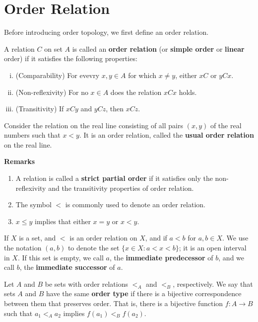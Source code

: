 \documentclass[a4paper,english,12pt]{article}
\begin{document}
\section{Order Relation}  

Before introducing order topology, we first define an order relation.
\begin{defn}
A relation $C$ on set $A$ is called an \textbf{order relation} (or  \textbf{simple order} or \textbf{linear} order) if it satisfies the following properties:
\begin{enumerate}[i)]
\item (Comparability) For evevry $x, y \in A$ for which $x \neq y$, either $x C$ or $y C x$.
\item (Non-reflexivity) For no $x \in A$ does the relation $x C x$ holds.
\item (Transitivity) If $x C y$ and $y C z$, then $x C z$.
\end{enumerate}
\end{defn}

\begin{exmp}
Consider the relation on the real line consisting of all pairs $(x, y)$ of the real numbers such that $x < y$. It is an order relation, called the \textbf{usual order relation} on the real line.
\end{exmp}


\textbf{Remarks}
\begin{enumerate}
\item A relation is called a \textbf{strict partial order} if it satisfies only the non-reflexivity and the transitivity properties of order relation.    
\item The symbol $<$ is commonly used to denote an order relation.
\item $x \le y$ implies that either $x = y$ or $x < y$. 
\end{enumerate}

\begin{defn}
If $X$ is a set, and $<$ is an order relation on $X$, and if $a < b$ for $a, b \in X$. We use the notation $(a,b)$ to denote the set $ \{ x \in X: a < x < b \}$; it is an open interval in $X$. If this set is empty, we call $a$, the \textbf{immediate predecessor} of $b$, and we call $b$, the \textbf{immediate successor} of $a$.
\end{defn}


\begin{defn}
Let $A$ and $B$ be sets with order relations $<_{A}$ and $<_{B}$, respectively. We say that sets $A$ and $B$ have the same \textbf{order type} if there is a bijective correspondence between them that preserves order. That is, there is a bijective function $f: A \to B$ such that $a_{1} <_{A} a_{2}$ implies $f(a_{1}) <_{B} f(a_{2})$.
\end{defn}
\end{document}
